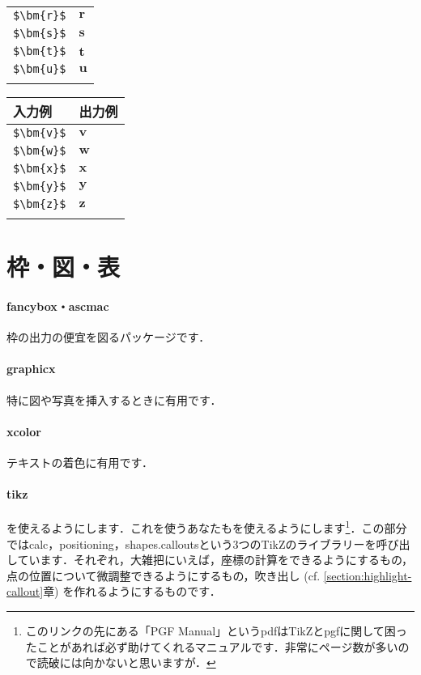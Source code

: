 \documentclass[uplatex]{jsreport}
\begin{document}
\begin{table}[htbp]
\begin{tabular}{ll}
    \verb|$\bm{r}$| & $\bm{r}$ \\
    \verb|$\bm{s}$| & $\bm{s}$ \\
    \verb|$\bm{t}$| & $\bm{t}$ \\
    \verb|$\bm{u}$| & $\bm{u}$ \\\\\hline
  \end{tabular}
  \begin{tabular}{ll}\hline
    入力例 & 出力例 \\ \hline
    \verb|$\bm{v}$| & $\bm{v}$ \\
    \verb|$\bm{w}$| & $\bm{w}$ \\
    \verb|$\bm{x}$| & $\bm{x}$ \\
    \verb|$\bm{y}$| & $\bm{y}$ \\
    \verb|$\bm{z}$| & $\bm{z}$ \\\\\hline
  \end{tabular}
\end{table}\par

\section{枠・図・表}
\paragraph{fancybox・ascmac} 枠の出力の便宜を図るパッケージです\cite{fancybox,ascmac}．
\paragraph{graphicx} 特に図や写真を挿入するときに有用です\cite{graphicx}．
\paragraph{xcolor} テキストの着色に有用です\cite{xcolor}．
\paragraph{tikz} {\TikZ}を使えるようにします．これを使うあなたも{\TikZ}を使えるようにします\cite{pgf}\footnote{このリンクの先にある「PGF Manual」というpdfはTikZとpgfに関して困ったことがあれば必ず助けてくれるマニュアルです．非常にページ数が多いので読破には向かないと思いますが．}．この部分ではcalc，positioning，shapes.calloutsという3つのTikZのライブラリーを呼び出しています．それぞれ，大雑把にいえば，座標の計算をできるようにするもの，点の位置について微調整できるようにするもの，吹き出し (cf. \ref{section:highlight-callout}章) を作れるようにするものです．
\end{document}
